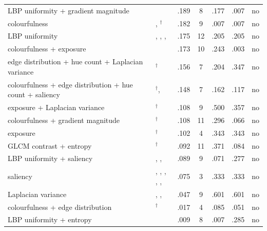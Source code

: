 \begin{table}[!ht]
\begin{tabular}{@{}>{\raggedright\arraybackslash}p{2.7cm}>{\raggedright\arraybackslash}p{3.55cm}ccccc@{}}
LBP uniformity + gradient magnitude & \cite{nandini2022edgelbp} & .189 & 8 & .177 & .007 & no \\
colourfulness & \cite{gygli2014creating}, \cite{hasler2003colorfulness}$^{\dagger}$ & .182 & 9 & .007 & .007 & no \\
LBP uniformity & \cite{barbieri2020webmedia}, \cite{barbieri2021content}, \cite{barbieri2021tese}, \cite{gharbi2019repeatability} & .175 & 12 & .205 & .205 & no \\
colourfulness + exposure & \cite{datta2006aesthetics} & .173 & 10 & .243 & .003 & no \\
edge distribution + hue count + Laplacian variance & \cite{ke2006highlevel}$^{\dagger}$ & .156 & 7 & .204 & .347 & no \\
colourfulness + edge distribution + hue count + saliency & \cite{srinivas2016rank}$^{\dagger}$, \cite{tang2013content} & .148 & 7 & .162 & .117 & no \\
exposure + Laplacian variance & \cite{korolkov2025keyframe}$^{\dagger}$ & .108 & 9 & .500 & .357 & no \\
colourfulness + gradient magnitude & \cite{qaroush2025diversity}$^{\dagger}$ & .108 & 11 & .296 & .066 & no \\
exposure & \cite{huang2024aesthetic}$^{\dagger}$ & .102 & 4 & .343 & .343 & no \\
GLCM contrast + entropy & \cite{yang2024keyframe}$^{\dagger}$ & .092 & 11 & .371 & .084 & no \\
LBP uniformity + saliency & \cite{qaroush2025centrality}, \cite{zhang2015aesthetics}, \cite{zhang2016georeferenced} & .089 & 9 & .071 & .277 & no \\
saliency & \cite{hussain2021mvs}, \cite{ngo2005graphmodeling}, \cite{nie2016perceptual}, \cite{park2025videograph}, \cite{zhang2015handheld}, \cite{zhang2015skimlets} & .075 & 3 & .333 & .333 & no \\
Laplacian variance & \cite{jeong2017static}, \cite{mittal2012brisque}, \cite{mittal2013niqe} & .047 & 9 & .601 & .601 & no \\
colourfulness + edge distribution & \cite{xu2024property}$^{\dagger}$ & .017 & 4 & .085 & .051 & no \\
LBP uniformity + entropy & \cite{chitrakala2025symmetry} & .009 & 8 & .007 & .285 & no \\
\bottomrule
\end{tabular}
\end{table}
